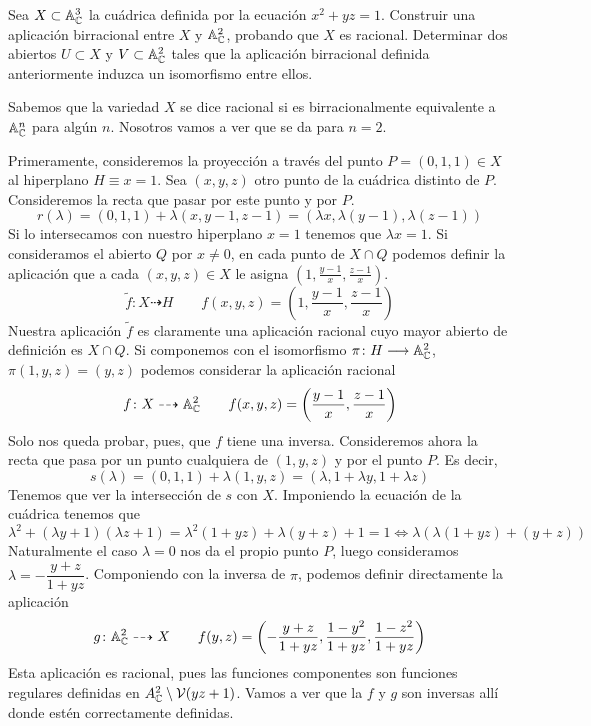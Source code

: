 \documentclass[twoside]{article}
\begin{document}
\newpage

\begin{ejercicio}{2} Sea $X\subset \mathbb{A}^3_{\mathbb{C}}$ la cuádrica definida por la ecuación $x^2 + yz =1$. Construir una aplicación birracional entre $X$ y $\mathbb{A}^2_{\mathbb{C}}$, probando que $X$ es racional. Determinar dos abiertos $U\subset X$ y $V\subset \mathbb{A}^2_{\mathbb{C}}$ tales que la aplicación birracional definida anteriormente induzca un isomorfismo entre ellos.
\end{ejercicio}
\begin{solucion}
Sabemos que la variedad $X$ se dice racional si es birracionalmente equivalente a $\mathbb{A}_{\mathbb{C}}^n$ para algún $n$. Nosotros vamos a ver que se da para $n=2$. 

Primeramente, consideremos la proyección a través del punto $P=(0,1,1)\in X$ al hiperplano $H\equiv x=1$. Sea $(x,y,z)$ otro punto de la cuádrica distinto de $P$. Consideremos la recta que pasar por este punto y por $P$.
$$
r(\lambda)= (0,1,1)+\lambda (x,y-1,z-1) = (\lambda x,\lambda (y-1),\lambda (z-1))
$$
Si lo intersecamos con nuestro hiperplano $x=1$ tenemos que $\lambda x= 1$. Si consideramos el abierto $Q$ por $x\neq 0$, en cada punto de $X\cap Q$ podemos definir la aplicación que a cada $(x,y,z)\in X$ le asigna $(1,\frac{y-1}{x},\frac{z-1}{x})$.
$$
\tilde{f}\colon  X \dashrightarrow H \qquad f(x,y,z) = \left(1,\frac{y-1}{x},\frac{z-1}{x}\right)
$$
Nuestra aplicación $\tilde{f}$ es claramente una aplicación racional cuyo mayor abierto de definición es $X\cap Q$. Si componemos con el isomorfismo $\pi\colon{H}\longrightarrow{\mathbb{A}^2_{\mathbb{C}}}$, $\pi (1,y,z) = (y,z)$ podemos considerar la aplicación racional
$$
f\colon X\dashrightarrow \mathbb{A}^2_{\mathbb{C}} \qquad f(x,y,z) =\left(\frac{y-1}{x},\frac{z-1}{x}\right)
$$
Solo nos queda probar, pues, que $f$ tiene una inversa. Consideremos ahora la recta que pasa por un punto cualquiera de $(1,y,z)$ y por el punto $P$. Es decir,
$$
s(\lambda) = (0,1,1)+\lambda(1,y,z)=(\lambda, 1+\lambda y, 1+ \lambda z)
$$
Tenemos que ver la intersección de $s$ con $X$. Imponiendo la ecuación de la cuádrica tenemos que
$$\lambda^2 + (\lambda y+1)(\lambda z + 1) = \lambda^2 (1+yz)+\lambda(y+z)+1 = 1 \Leftrightarrow \lambda(\lambda(1+yz)+(y+z))$$
Naturalmente el caso $\lambda =0$ nos da el propio punto $P$, luego consideramos $\lambda = -\dfrac{y+z}{1+yz}$. Componiendo con la inversa de $\pi$, podemos definir directamente la aplicación
$$
g\colon  \mathbb{A}_{\mathbb{C}}^2 \dashrightarrow X \qquad f(y,z) =\left(-\dfrac{y+z}{1+yz},\dfrac{1-y^2}{1+yz},\dfrac{1-z^2}{1+yz}\right) 
$$
Esta aplicación es racional, pues las funciones componentes son funciones regulares definidas en $A^2_{\mathbb{C}} \setminus \mathcal{V}(yz+1)$. Vamos a ver que la $f$ y $g$ son inversas allí donde estén correctamente definidas.

\end{solucion}
\end{document}
